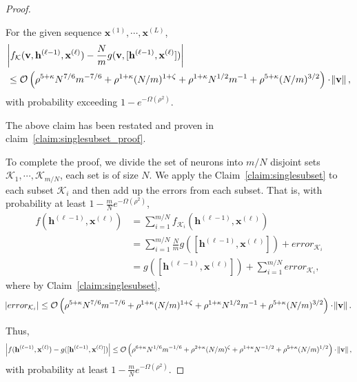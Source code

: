 \begin{proof}
	\begin{claim}\label{claim:singlesubset}
		For the given sequence $\mathbf{x}^{(1)}, \cdots, \mathbf{x}^{(L)}$,
		\begin{align*}
			&\abs{f_{\mathcal{K}}(\mathbf{v}, \mathbf{h}^{(\ell-1)}, \mathbf{x}^{(\ell)}) - \frac{N}{m}g(\mathbf{v}, [\mathbf{h}^{(\ell-1)}, \mathbf{x}^{(\ell)}])} \\&\le  \mathcal{O}\left(\rho^{5 + \kappa} N^{7/6} m^{-7/6} + \rho^{1 + \kappa} (N/m)^{1+\zeta} + \rho^{1+\kappa} N^{1/2} m^{-1}  + \rho^{5 + \kappa} (N/m)^{3/2}\right) \cdot \norm{\mathbf{v}},
		\end{align*}
		with probability exceeding $1 - e^{-\Omega(\rho^2)}$.
	\end{claim}
	The above claim has been restated and proven in claim~\ref{claim:singlesubset_proof}.
	
	To complete the proof, we divide the set of neurons into $m/N$ disjoint sets $\mathcal{K}_1, \cdots, \mathcal{K}_{m/N}$, each set is of size $N$. We apply the Claim~\ref{claim:singlesubset} to each subset $\mathcal{K}_i$ and then add up the errors from each subset. That is, with probability at least $1 - \frac{m}{N}e^{-\Omega(\rho^2)}$,
	\begin{align*}
		f(\mathbf{h}^{(\ell-1)}, \mathbf{x}^{(\ell)}) &=  \sum_{i=1}^{m/N}  f_{\mathcal{K}_i}(\mathbf{h}^{(\ell-1)}, \mathbf{x}^{(\ell)})\\
		&= \sum_{i=1}^{m/N} \frac{N}{m} g([\mathbf{h}^{(\ell-1)}, \mathbf{x}^{(\ell)}]) + error_{\mathcal{K}_i}\\
		&= g([\mathbf{h}^{(\ell-1)}, \mathbf{x}^{(\ell)}]) + \sum_{i=1}^{m/N} error_{\mathcal{K}_i}, 
	\end{align*}
	where by Claim~\ref{claim:singlesubset},
	\begin{align*}
		\abs{error_{\mathcal{K}_i}} \le \mathcal{O}\left(\rho^{5 + \kappa} N^{7/6} m^{-7/6} + \rho^{1 + \kappa} (N/m)^{1+\zeta} + \rho^{1+\kappa} N^{1/2} m^{-1}  + \rho^{5 + \kappa} (N/m)^{3/2}\right) \cdot \norm{\mathbf{v}}.
	\end{align*}
	
	Thus,
	\begin{equation*}
		\abs{ f(\mathbf{h}^{(\ell-1)}, \mathbf{x}^{(\ell)}) - g([\mathbf{h}^{(\ell-1)}, \mathbf{x}^{(\ell)}])} \le \mathcal{O}\left(\rho^{6 + \kappa} N^{1/6} m^{-1/6} + \rho^{2 + \kappa} (N/m)^{\zeta} + \rho^{1+\kappa} N^{-1/2} + \rho^{5 + \kappa} (N/m)^{1/2}\right) \cdot \norm{\mathbf{v}},
	\end{equation*}
	with probability at least $1 - \frac{m}{N}e^{-\Omega(\rho^2)}$.
	

\end{proof}
